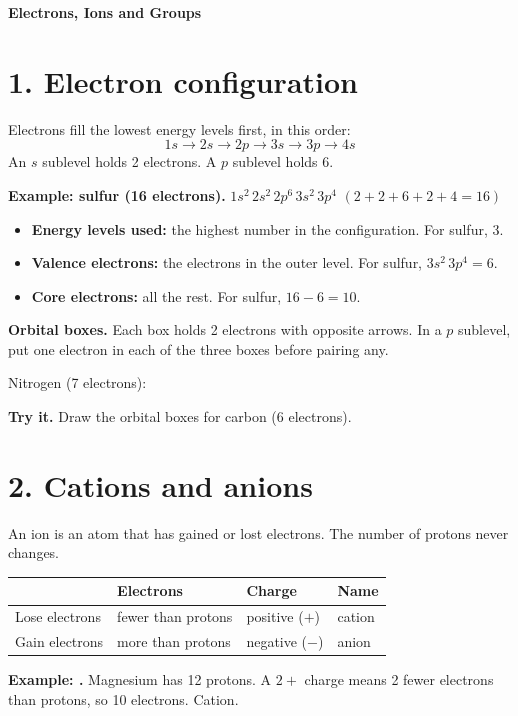 

{\Large\bfseries Electrons, Ions and Groups}\par\nm
\section*{1. Electron configuration}
Electrons fill the lowest energy levels first, in this order:
\[ 1s \rightarrow 2s \rightarrow 2p \rightarrow 3s \rightarrow 3p \rightarrow 4s \]
An $s$ sublevel holds 2 electrons. A $p$ sublevel holds 6.

\textbf{Example: sulfur (16 electrons).} \quad $1s^2\,2s^2\,2p^6\,3s^2\,3p^4$ \quad $(2+2+6+2+4=16)$
\begin{itemize}[nosep]
\item \textbf{Energy levels used:} the highest number in the configuration. For sulfur, 3.
\item \textbf{Valence electrons:} the electrons in the outer level. For sulfur, $3s^2\,3p^4 = 6$.
\item \textbf{Core electrons:} all the rest. For sulfur, $16-6=10$.
\end{itemize}

\textbf{Orbital boxes.} Each box holds 2 electrons with opposite arrows. In a $p$ sublevel, put one electron in each of the three boxes before pairing any.

Nitrogen (7 electrons):\quad {}

\textbf{Try it.} Draw the orbital boxes for carbon (6 electrons).\par\vspace{6pt}

\section*{2. Cations and anions}
An ion is an atom that has gained or lost electrons. The number of protons never changes.

\begin{tabular}{llll}\toprule
 & Electrons & Charge & Name\\\midrule
Lose electrons & fewer than protons & positive ($+$) & cation\\
Gain electrons & more than protons & negative ($-$) & anion\\\bottomrule
\end{tabular}

\textbf{Example: .} Magnesium has 12 protons. A $2+$ charge means 2 fewer electrons than protons, so 10 electrons. Cation.

